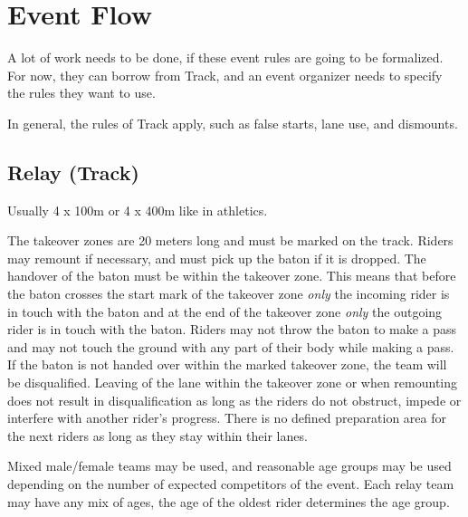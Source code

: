 \section{Event Flow}

\begin{comment-2016}
  A lot of work needs to be done, if these event rules are going to be
  formalized.  For now, they can borrow from Track, and an event organizer
  needs to specify the rules they want to use.
\end{comment-2016}

In general, the rules of Track apply, such as false starts, lane use, and dismounts.

\subsection{Relay (Track)}
Usually 4 x 100m or 4 x 400m like in athletics.

The takeover zones are 20 meters long and must be marked on the track.
Riders may remount if necessary, and must pick up the baton if it is dropped.
The handover of the baton must be within the takeover zone.
This means that before the baton crosses the start mark of the takeover zone \emph{only} the incoming rider is in touch with the baton and at the end of the takeover zone \emph{only} the outgoing rider is in touch with the baton.
Riders may not throw the baton to make a pass and may not touch the ground with any part of their body while making a pass.
If the baton is not handed over within the marked takeover zone, the team will be disqualified.
Leaving of the lane within the takeover zone or when remounting does not result in disqualification as long as the riders do not obstruct, impede or interfere with another rider's progress.
There is no defined preparation area for the next riders as long as they stay within their lanes.

Mixed male/female teams may be used, and reasonable age groups may be used depending on the number of expected competitors of the event.
Each relay team may have any mix of ages, the age of the oldest rider determines the age group.

